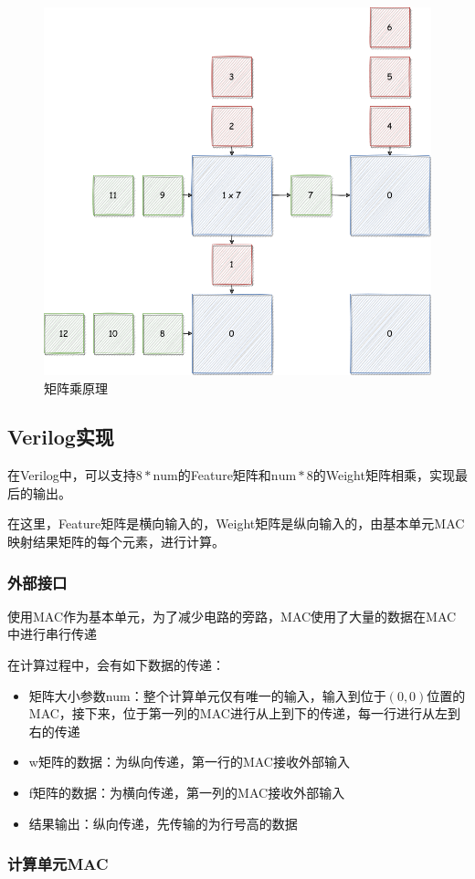 \documentclass[12pt,a4paper]{article}
\begin{document}
\begin{figure}[htbp]
    \centering
    \includegraphics[width=0.6\linewidth]{img/矩阵乘原理.png}
    \caption{矩阵乘原理}
\end{figure} 


\subsection{Verilog实现}

在Verilog中，可以支持$8 * \text{num}$的Feature矩阵和$\text{num} * 8$的Weight矩阵相乘，实现最后的输出。

在这里，Feature矩阵是横向输入的，Weight矩阵是纵向输入的，由基本单元MAC映射结果矩阵的每个元素，进行计算。

\subsubsection{外部接口}

使用MAC作为基本单元，为了减少电路的旁路，MAC使用了大量的数据在MAC中进行串行传递

在计算过程中，会有如下数据的传递：

\begin{itemize}
\item
  矩阵大小参数num：整个计算单元仅有唯一的输入，输入到位于\((0, 0)\)位置的MAC，接下来，位于第一列的MAC进行从上到下的传递，每一行进行从左到右的传递
\item
  w矩阵的数据：为纵向传递，第一行的MAC接收外部输入
\item
  f矩阵的数据：为横向传递，第一列的MAC接收外部输入
\item
  结果输出：纵向传递，先传输的为行号高的数据
\end{itemize}

\subsubsection{计算单元MAC}
\end{document}
